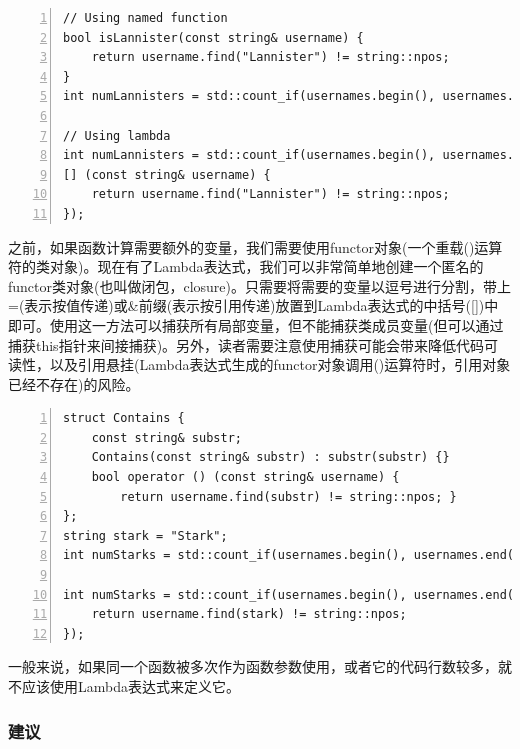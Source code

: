\documentclass{ctexart}
\begin{document}
\begin{lstlisting}[language={[ANSI]C},keywordstyle=\color{blue!70},commentstyle=\color{red!50!green!50!blue!50},frame=shadowbox, rulesepcolor=\color{red!20!green!20!blue!20},basicstyle=\small,numbers=left, numberstyle=\tiny,breaklines=true]
// Using named function
bool isLannister(const string& username) {  
	return username.find("Lannister") != string::npos;  
}  
int numLannisters = std::count_if(usernames.begin(), usernames.end(), isLannister);  

// Using lambda
int numLannisters = std::count_if(usernames.begin(), usernames.end(),  
[] (const string& username) {   
	return username.find("Lannister") != string::npos;  
});
\end{lstlisting}

之前，如果函数计算需要额外的变量，我们需要使用functor对象(一个重载()运算符的类对象)。现在有了Lambda表达式，我们可以非常简单地创建一个匿名的functor类对象(也叫做闭包，closure)。只需要将需要的变量以逗号进行分割，带上=(表示按值传递)或\&前缀(表示按引用传递)放置到Lambda表达式的中括号([])中即可。使用这一方法可以捕获所有局部变量，但不能捕获类成员变量(但可以通过捕获this指针来间接捕获)。另外，读者需要注意使用捕获可能会带来降低代码可读性，以及引用悬挂(Lambda表达式生成的functor对象调用()运算符时，引用对象已经不存在)的风险。

\begin{lstlisting}[language={[ANSI]C},keywordstyle=\color{blue!70},commentstyle=\color{red!50!green!50!blue!50},frame=shadowbox, rulesepcolor=\color{red!20!green!20!blue!20},basicstyle=\small,numbers=left, numberstyle=\tiny,breaklines=true]
struct Contains {  
	const string& substr;  
	Contains(const string& substr) : substr(substr) {}  
	bool operator () (const string& username) {  
		return username.find(substr) != string::npos; }  
};  
string stark = "Stark";  
int numStarks = std::count_if(usernames.begin(), usernames.end(), Contains(stark));  

int numStarks = std::count_if(usernames.begin(), usernames.end(), [&stark] (const string& username) {  
	return username.find(stark) != string::npos;  
});
\end{lstlisting}

一般来说，如果同一个函数被多次作为函数参数使用，或者它的代码行数较多，就不应该使用Lambda表达式来定义它。

\subsubsection*{建议}
\end{document}
